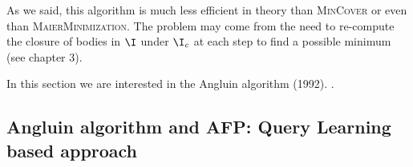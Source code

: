 \begin{figure}[ht]
	
\end{figure}

As we said, this algorithm is much less 
efficient in theory than \textsc{MinCover} or even than \textsc{MaierMinimization}. The problem may come from the need to re-compute the closure of bodies in $\I$ under $\I_c$ at each step to find a possible minimum (see chapter 3).



In this section we are interested in the Angluin algorithm (1992). 
\cite{angluin_learning_1992, arias_canonical_2009}.

\subsection{Angluin algorithm and AFP: Query Learning based approach}

